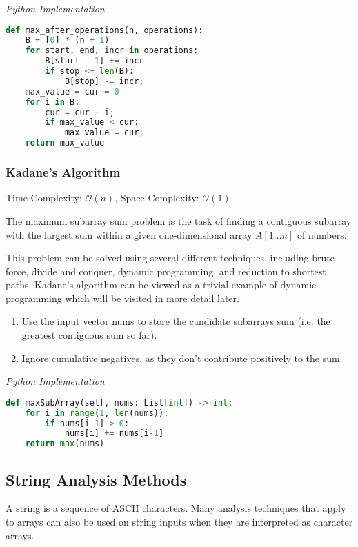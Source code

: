 \documentclass{article}
\newcommand{\bigO}{\mathcal{O}}
\begin{document}
\vspace{8pt} \emph{Python Implementation}
\begin{lstlisting}[language=Python]
def max_after_operations(n, operations):
    B = [0] * (n + 1)
    for start, end, incr in operations:
        B[start - 1] += incr
        if stop <= len(B):
            B[stop] -= incr;
    max_value = cur = 0
    for i in B:
        cur = cur + i;
        if max_value < cur: 
            max_value = cur;
    return max_value
\end{lstlisting}
    
    
    \subsubsection{Kadane's Algorithm}
    Time Complexity: $\bigO(n)$, Space Complexity: $\bigO(1)$
    
    The maximum subarray sum problem is the task of finding a contiguous subarray with the largest sum within a given one-dimensional array $A[1...n]$ of numbers.
    
    This problem can be solved using several different techniques, including brute force, divide and conquer, dynamic programming, and reduction to shortest paths. Kadane's algorithm can be viewed as a trivial example of dynamic programming which will be visited in more detail later.
    
    \begin{enumerate}
        \item Use the input vector nums to store the candidate subarrays sum (i.e. the greatest contiguous sum so far).
        \item Ignore cumulative negatives, as they don't contribute positively to the sum.
    \end{enumerate} 
    
\vspace{8pt} \emph{Python Implementation}
\begin{lstlisting}[language=Python]
def maxSubArray(self, nums: List[int]) -> int:
    for i in range(1, len(nums)):
        if nums[i-1] > 0:
            nums[i] += nums[i-1]
    return max(nums)
\end{lstlisting}
    
    \subsection{String Analysis Methods}
    A string is a sequence of ASCII characters. Many analysis techniques that apply to arrays can also be used on string inputs when they are interpreted as character arrays.
    
\end{document}
